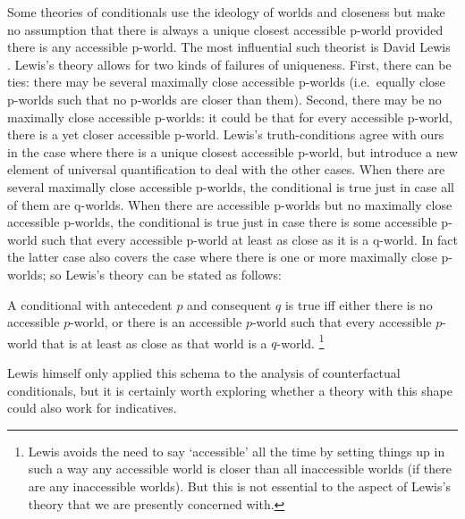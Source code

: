 \documentclass[If.tex]{subfiles}
\begin{document}
Some theories of conditionals use the ideology of worlds and closeness but make no assumption that there is always a unique closest accessible p-world provided there is any accessible p-world. The most influential such theorist is David Lewis \citeyearpar{LewisCounterfactuals}. Lewis's theory allows for two kinds of failures of uniqueness. First, there can be ties: there may be several maximally close accessible p-worlds (i.e.\ equally close p-worlds such that no p-worlds are closer than them). Second, there may be no maximally close accessible p-worlds: it could be that for every accessible p-world, there is a yet closer accessible p-world. Lewis's truth-conditions agree with ours in the case where there is a unique closest accessible p-world, but introduce a new element of universal quantification to deal with the other cases. When there are several maximally close accessible p-worlds, the conditional is true just in case all of them are q-worlds. When there are accessible p-worlds but no maximally close accessible p-worlds, the conditional is true just in case there is some accessible p-world such that every accessible p-world at least as close as it is a q-world. In fact the latter case also covers the case where there is one or more maximally close p-worlds; so Lewis's theory can be stated as follows:
\begin{prop}
\litem[LEWIS] \label{lewis}
	A conditional with antecedent $p$ and consequent $q$ is true iff either there is no accessible $p$-world, or there is an accessible $p$-world such that every accessible $p$-world that is at least as close as that world is a $q$-world.%
	\footnote{Lewis avoids the need to say ‘accessible’ all the time by setting things up in such a way any accessible world is closer than all inaccessible worlds (if there are any inaccessible worlds). But this is not essential to the aspect of Lewis's theory that we are presently concerned with.} 
\end{prop}
Lewis himself only applied this schema to the analysis of counterfactual conditionals, but it is certainly worth exploring whether a theory with this shape could also work for indicatives.
\end{document}
